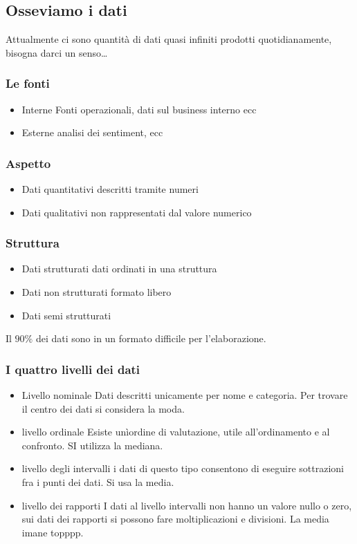 \subsection{Osseviamo i dati}
Attualmente ci sono quantità di dati quasi infiniti prodotti quotidianamente,
bisogna darci un senso\ldots

\subsubsection{Le fonti}

\begin{itemize}
    \item Interne
    Fonti operazionali, dati sul business interno ecc
    \item Esterne
    analisi dei sentiment, ecc
\end{itemize}
\subsubsection{Aspetto}

\begin{itemize}
    \item Dati quantitativi
    descritti tramite numeri
    \item Dati qualitativi
    non rappresentati dal valore numerico
\end{itemize}

\subsubsection{Struttura}
\begin{itemize}
    \item Dati strutturati
    dati ordinati in una struttura
    \item Dati non strutturati
    formato libero
    \item Dati semi strutturati
\end{itemize}

Il $90\%$ dei dati sono in un formato difficile per l'elaborazione.

\subsubsection{I quattro livelli dei dati}
\begin{itemize}
    \item Livello nominale
    Dati descritti unicamente per nome e categoria.
    Per trovare il centro dei dati si considera la moda.
    \item livello ordinale
    Esiste unìordine di valutazione, utile all'ordinamento e al confronto.
    SI utilizza la mediana.
    \item livello degli intervalli
    i dati di questo tipo consentono di eseguire sottrazioni fra i punti dei dati.
    Si usa la media.
    \item livello dei rapporti
    I dati al livello intervalli non hanno un valore nullo o zero, sui dati dei rapporti si possono fare
    moltiplicazioni e divisioni.
    La media imane topppp.
\end{itemize}


